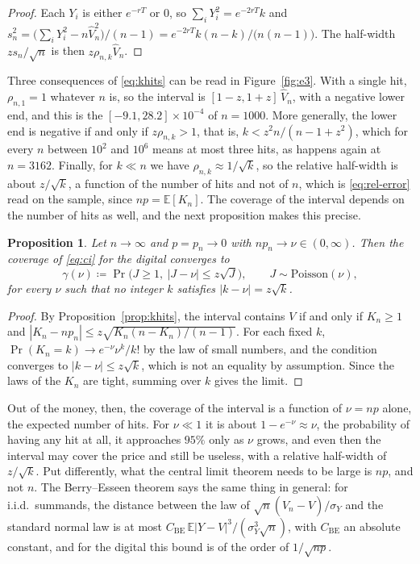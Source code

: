 \documentclass[11pt,a4paper]{article}
\theoremstyle{plain}
\newtheorem{proposition}[theorem]{Proposition}
\theoremstyle{definition}
\theoremstyle{remark}
\newcommand{\E}{\mathbb{E}}
\newcommand{\1}{\mathbf{1}}
\newcommand{\eqdef}{\coloneqq}
\begin{document}
\begin{proof}
Each $Y_i$ is either $e^{-rT}$ or $0$, so $\sum_i Y_i^2 = e^{-2rT}k$ and $s_n^2 = \bigl(\sum_i Y_i^2 - n\hat V_n^2\bigr)/(n-1) = e^{-2rT}k(n-k)/\bigl(n(n-1)\bigr)$. The half-width $z s_n/\sqrt n$ is then $z\rho_{n,k}\hat V_n$.
\end{proof}

Three consequences of \eqref{eq:khits} can be read in Figure~\ref{fig:e3}. With a single hit, $\rho_{n,1} = 1$ whatever $n$ is, so the interval is $[1 - z, 1 + z]\,\hat V_n$, with a negative lower end, and this is the $[-9.1, 28.2] \times 10^{-4}$ of $n = 1000$. More generally, the lower end is negative if and only if $z\rho_{n,k} > 1$, that is, $k < z^2 n/(n - 1 + z^2)$, which for every $n$ between $10^2$ and $10^6$ means at most three hits, as happens again at $n = 3162$. Finally, for $k \ll n$ we have $\rho_{n,k} \approx 1/\sqrt k$, so the relative half-width is about $z/\sqrt k$, a function of the number of hits and not of $n$, which is \eqref{eq:rel-error} read on the sample, since $np = \E[K_n]$. The coverage of the interval depends on the number of hits as well, and the next proposition makes this precise.

\begin{proposition}\label{prop:poisson}
Let $n \to \infty$ and $p = p_n \to 0$ with $np_n \to \nu \in (0, \infty)$. Then the coverage of \eqref{eq:ci} for the digital converges to
\[
  \gamma(\nu) \eqdef \Pr\bigl(J \ge 1,\ |J - \nu| \le z\sqrt{J}\bigr), \qquad J \sim \mathrm{Poisson}(\nu),
\]
for every $\nu$ such that no integer $k$ satisfies $|k - \nu| = z\sqrt k$.
\end{proposition}

\begin{proof}
By Proposition~\ref{prop:khits}, the interval contains $V$ if and only if $K_n \ge 1$ and $|K_n - np_n| \le z\sqrt{K_n(n - K_n)/(n-1)}$. For each fixed $k$, $\Pr(K_n = k) \to e^{-\nu}\nu^k/k!$ by the law of small numbers, and the condition converges to $|k - \nu| \le z\sqrt k$, which is not an equality by assumption. Since the laws of the $K_n$ are tight, summing over $k$ gives the limit.
\end{proof}

Out of the money, then, the coverage of the interval is a function of $\nu = np$ alone, the expected number of hits. For $\nu \ll 1$ it is about $1 - e^{-\nu} \approx \nu$, the probability of having any hit at all, it approaches $95\%$ only as $\nu$ grows, and even then the interval may cover the price and still be useless, with a relative half-width of $z/\sqrt k$. Put differently, what the central limit theorem needs to be large is $np$, and not $n$. The Berry--Esseen theorem says the same thing in general: for i.i.d.\ summands, the distance between the law of $\sqrt n(\hat V_n - V)/\sigma_Y$ and the standard normal law is at most $C_{\mathrm{BE}}\,\E|Y - V|^3/(\sigma_Y^3\sqrt n)$, with $C_{\mathrm{BE}}$ an absolute constant, and for the digital this bound is of the order of $1/\sqrt{np}$.
\end{document}
